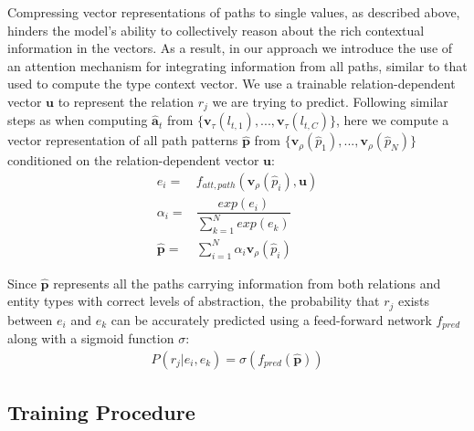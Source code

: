 \documentclass[letterpaper]{article} %
\begin{document}
Compressing vector representations of paths to single values, as described above, hinders the model's ability to collectively reason about the rich contextual information in the vectors.  As a result, in our approach we introduce the use of an attention mechanism for integrating information from all paths, similar to that used to compute the type context vector. We use a trainable relation-dependent vector $\bm{u}$ to represent the relation $r_j$ we are trying to predict. Following similar steps as when computing $\hat{\mathbf{a}}_t$ from $\{\bm{v}_\tau(l_{t,1}),...,\bm{v}_\tau(l_{t,C})\}$, here we compute a vector representation of all path patterns $\hat{\mathbf{p}}$ from $\{ \bm{v}_\rho(\hat{p}_1),...,\bm{v}_\rho(\hat{p}_N) \}$ conditioned on the relation-dependent vector $\bm{u}$:%
\begin{align}
	e_{i} =& f_{att, path}(\bm{v}_\rho(\hat{p}_i), \bm{u}) \\
	\alpha_{i} =& \dfrac{exp(e_{i})}{\sum_{k=1}^{N} exp(e_{k})} \\
	\hat{\mathbf{p}} =& \sum_{i=1}^{N} \alpha_{i} \bm{v}_\rho(\hat{p}_i)
\end{align} %

Since $\hat{\mathbf{p}}$ represents all the paths carrying information from both relations and entity types with correct levels of abstraction, the probability that $r_j$ exists between $e_i$ and $e_k$ can be accurately predicted using a feed-forward network $f_{pred}$ along with a sigmoid function $\sigma$: %
\begin{align}
	P(r_j|e_i, e_k) = \sigma (f_{pred}(\hat{\mathbf{p}}))
\end{align} %

\subsection{Training Procedure}
\end{document}
